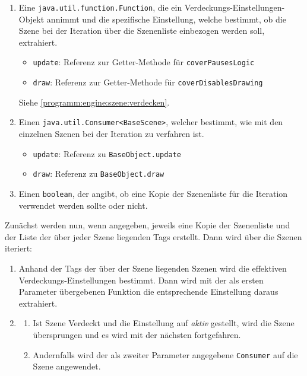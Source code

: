 \begin{sloppypar}
\begin{enumerate}
	\item Eine \texttt{java.util.function.Function}, die ein Verdeckungs-Einstellungen-Objekt
	      annimmt und die spezifische Einstellung, welche bestimmt, ob die Szene bei
	      der Iteration über die Szenenliste einbezogen werden soll, extrahiert.
	      \begin{itemize}
	          \item \texttt{update}: Referenz zur Getter-Methode für \texttt{coverPausesLogic}
	          \item \texttt{draw}: Referenz zur Getter-Methode für \texttt{coverDisablesDrawing}
	      \end{itemize}
	      Siehe \ref{programm:engine:szene:verdecken}.
	\item Einen \texttt{java.util.Consumer<BaseScene>}, welcher bestimmt, wie mit
	      den einzelnen Szenen bei der Iteration zu verfahren ist.
 	      \begin{itemize}
	      	\item \texttt{update}: Referenz zu \texttt{BaseObject.update}
	      	\item \texttt{draw}: Referenz zu \texttt{BaseObject.draw}
	      \end{itemize}
	\item Einen \texttt{boolean}, der angibt, ob eine Kopie der Szenenliste
	      für die Iteration verwendet werden sollte oder nicht.
\end{enumerate}

Zunächst werden nun, wenn angegeben, jeweils eine Kopie der Szenenliste und der
Liste der über jeder Szene liegenden Tags erstellt. Dann wird über die Szenen
iteriert:

\begin{enumerate}
	\item Anhand der Tags der über der Szene liegenden Szenen wird
	      die effektiven Verdeckungs-Einstellungen bestimmt. Dann wird
	      mit der als ersten Parameter übergebenen Funktion die entsprechende
	      Einstellung daraus extrahiert.
	\item \begin{enumerate}
		\item Ist Szene Verdeckt und die Einstellung auf \textit{aktiv} gestellt,
		      wird die Szene übersprungen und es wird mit der nächsten fortgefahren.
		\item Andernfalls wird der als zweiter Parameter angegebene \texttt{Consumer}
		      auf die Szene angewendet.
	\end{enumerate}
\end{enumerate}



\end{sloppypar}
